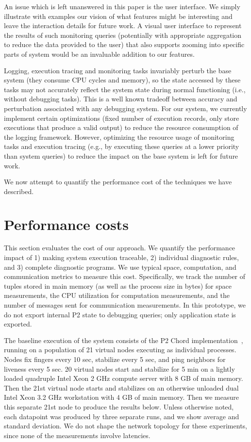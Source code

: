 \documentclass{sig-alt-full}
\def\Sys{P2\xspace}
\begin{document}
An issue which is left unanswered in this paper
is the user interface. We simply illustrate with
examples our vision of what features might be
interesting and leave the interaction details for
future work. A visual user interface to represent
the results of such monitoring queries
(potentially with appropriate aggregation to
reduce the data provided to the user) that also
supports zooming into specific parts of system
would be an invaluable addition to our features. 

Logging, execution tracing and monitoring tasks
invariably perturb the base system (they consume CPU cycles
and memory), so the state accessed
by these tasks may not accurately reflect the system state
during normal functioning (i.e., without debugging tasks). 
This is a well known tradeoff between accuracy and perturbation associated
with any debugging system. For our system, 
we currently implement certain
optimizations (fixed number of execution records, only store
executions that produce a valid output)
to reduce the resource consumption
of the logging framework. However, optimizing the resource
usage of monitoring tasks and execution tracing (e.g., by executing
these queries at a lower priority than system queries) to reduce the
impact on the base system is left
for future work.


We now attempt to quantify the performance cost of the
techniques we have described. 

\section{Performance costs}
\label{sec:evaluation}

This section evaluates the cost of our approach.  We quantify the
performance impact of 1) making system execution traceable, 2) 
individual diagnostic rules, and 3) complete diagnostic programs.   We
use typical space, computation, and communication metrics to measure
this cost. 
Specifically, we track the number of tuples stored in main memory (as
well as the process size in bytes) for space measurements, the CPU
utilization for computation measurements, and the number of messages
sent for communication measurements.  In this prototype, we do not export internal \Sys
state to debugging queries; only application state is
exported.

The baseline execution of the system consists of the P2 Chord
implementation~\cite{Loo2005SOSP}, running on a population of
21 virtual nodes executing as individual processes.  Nodes fix
fingers every 10 sec, stabilize every 5 sec, and ping neighbors for
liveness every 5 sec.  
20 virtual nodes start and stabilize for 5 min on a lightly loaded quadruple Intel Xeon
2 GHz compute server with 8 GB of main memory.   Then the 21st virtual
node starts and stabilizes on an otherwise unloaded dual Intel Xeon 3.2 GHz
workstation with 4 GB of main memory. Then we measure this separate 21st
node to produce the results below. Unless otherwise noted, each
datapoint was produced by three separate runs, and we show average and
standard deviation.  We do not shape the network
topology for these 
experiments, since none of the measurements involve latencies.
\end{document}
